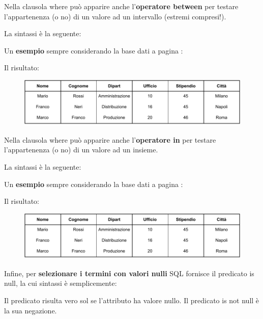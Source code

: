 \documentclass[a4paper]{article}
\begin{document}
	\noindent
	Nella clausola \textsf{where} può apparire anche l'\textbf{operatore \textsf{between}} per testare l'appartenenza (o no) di un valore ad un intervallo (estremi compresi!).\newline
	
	\noindent
	La sintassi è la seguente:
	
	Un \textcolor{Green4}{\textbf{esempio}} sempre considerando la base dati a pagina \pageref{img: select dbms}:
	
	Il risultato:
	\begin{figure}[!htp]
		\centering
		\includegraphics[width=\textwidth]{img/between-ex1.pdf}
	\end{figure}\:\newline

	\noindent
	Nella clausola \textsf{where} può apparire anche l'\textbf{operatore \textsf{in}} per testare l'appartenenza (o no) di un valore ad un insieme.\newline
	
	\noindent
	La sintassi è la seguente:
	
	Un \textcolor{Green4}{\textbf{esempio}} sempre considerando la base dati a pagina \pageref{img: select dbms}:
	
	Il risultato:
	\begin{figure}[!htp]
		\centering
		\includegraphics[width=\textwidth]{img/in-ex1.pdf}
	\end{figure}\newpage

	\noindent
	Infine, per \textbf{selezionare i termini con valori nulli} SQL fornisce il predicato \textsf{is null}, la cui sintassi è semplicemente:
	
	Il predicato risulta vero sol se l'attributo ha valore nullo. Il predicato \textsf{is not null} è la sua negazione.\newline
	
\end{document}
